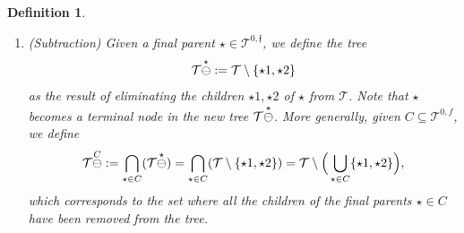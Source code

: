 \documentclass[%
11pt,  reqno]{amsart}
\makeatletter
\newcommand{\5}{\textup{V}}
\newcommand{\noi}{\noindent}
\newtheorem{definition}[theorem]{Definition}
\theoremstyle{remark}
\newcommand{\TT}{\mathcal{T}}
\newcommand{\ff}{\mathfrak{f}}
\def\<#1>{\csname MH@symb@#1\endcsname}
\numberwithin{equation}{section}
\numberwithin{theorem}{section}
\newcommand{\simao}[1]{\marginpar{\color{red} $\Leftarrow\Leftarrow\Leftarrow$}{\smallskip \noi\color{red}SIMAO: #1}\smallskip}
\makeatother
\begin{document}
\begin{definition}
\begin{enumerate}
\smallskip
\item[(ii)] (Subtraction) 
Given a final parent $\star  \in \TT^{0,\ff}$, we define the tree
$$
\TT \overset{\star }{\ominus } \<1>
: = \TT \setminus \{ \star1, \star2  \}
$$
as the result of eliminating the children $\star1, \star2$ of $\star$
from $\TT$. Note that $\star$ becomes a terminal node in the new tree $\TT \overset{\star}{\ominus } \<1>$. 
More generally, given $C\subseteq \TT^{0,f}$, we define
\begin{align}
\label{treeSubtr}
\TT \overset{C}{\ominus} \<1> : =
 \bigcap_{\star \in C} ( \TT \overset{\star}{\ominus}  \<1>)
= \bigcap_{\star\in C} (\TT \setminus \{\star1,\star2\})
= \TT \setminus \Big( \bigcup_{\star\in C} \{\star1,\star2\} \Big), 
\end{align}
which corresponds to the set where all the children of the final parents $\star\in C$ have been removed from the tree.




\end{enumerate}



\end{definition}
\end{document}
